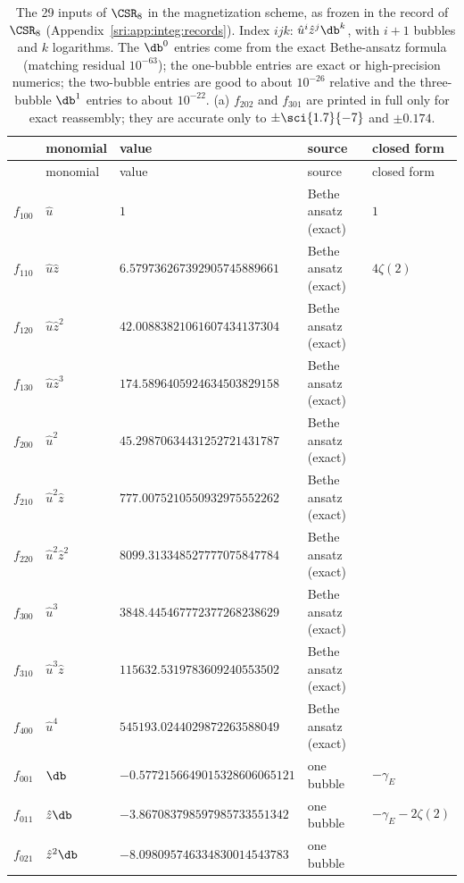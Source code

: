 {\small
\renewcommand{\arraystretch}{1.1}
\begin{longtable}{@{}lllll@{}}
\caption{The 29 inputs of $\CSR_8$ in the magnetization scheme, as frozen in the record of $\CSR_8$
(Appendix~\ref{sri:app:integ:records}). Index $ijk$: $\hat u^i\hat z^j\db^k$, with $i+1$ bubbles and $k$ logarithms.
The $\db^0$ entries come from the exact Bethe-ansatz formula (matching residual $10^{-63}$); the one-bubble entries are exact or
high-precision numerics; the two-bubble entries are good to about $10^{-26}$ relative and the three-bubble $\db^1$
entries to about $10^{-22}$. (a) $f_{202}$ and $f_{301}$ are printed in full only for exact reassembly; they are
accurate only to $\pm\sci{1.7}{-7}$ and $\pm0.174$.}\label{sri:tab:integ:inputs}\\
\toprule
& monomial & value & source & closed form\\
\midrule\endfirsthead
\toprule
& monomial & value & source & closed form\\
\midrule\endhead
\bottomrule\endfoot
$f_{100}$ & $\hat u$ & $1$ & Bethe ansatz (exact) & $1$\\
$f_{110}$ & $\hat u\hat z$ & $6.579736267392905745889661$ & Bethe ansatz (exact) & $4\zeta(2)$\\
$f_{120}$ & $\hat u\hat z^2$ & $42.00883821061607434137304$ & Bethe ansatz (exact) & \\
$f_{130}$ & $\hat u\hat z^3$ & $174.5896405924634503829158$ & Bethe ansatz (exact) & \\
$f_{200}$ & $\hat u^2$ & $45.29870634431252721431787$ & Bethe ansatz (exact) & \\
$f_{210}$ & $\hat u^2\hat z$ & $777.0075210550932975552262$ & Bethe ansatz (exact) & \\
$f_{220}$ & $\hat u^2\hat z^2$ & $8099.313348527777075847784$ & Bethe ansatz (exact) & \\
$f_{300}$ & $\hat u^3$ & $3848.445467772377268238629$ & Bethe ansatz (exact) & \\
$f_{310}$ & $\hat u^3\hat z$ & $115632.5319783609240553502$ & Bethe ansatz (exact) & \\
$f_{400}$ & $\hat u^4$ & $545193.0244029872263588049$ & Bethe ansatz (exact) & \\
$f_{001}$ & $\db$ & $-0.5772156649015328606065121$ & one bubble & $-\gamma_E$\\
$f_{011}$ & $\hat z\db$ & $-3.867083798597985733551342$ & one bubble & $-\gamma_E-2\zeta(2)$\\
$f_{021}$ & $\hat z^2\db$ & $-8.098095746334830014543783$ & one bubble & \\

\end{longtable}}
